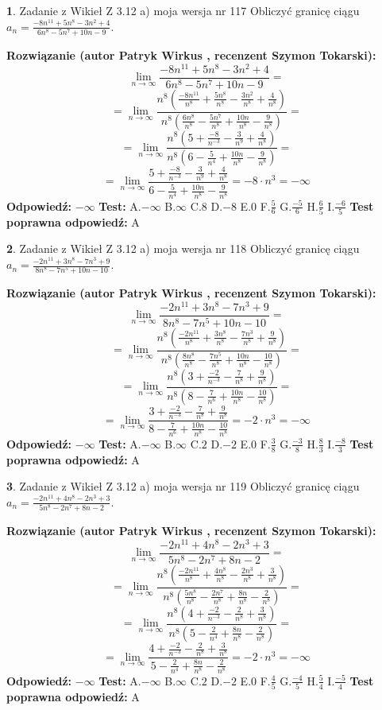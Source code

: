 \documentclass[12pt, a4paper]{article}
\theoremstyle{definition} %
\newtheorem{zad}{}
\newcommand{\zadStart}[1]{\begin{zad}#1\newline}
\newcommand{\zadStop}{\end{zad}}
\newcommand{\rozwStart}[2]{\noindent \textbf{Rozwiązanie (autor #1 , recenzent #2): }\newline}
\newcommand{\rozwStop}{\newline}
\newcommand{\odpStart}{\noindent \textbf{Odpowiedź:}\newline}
\newcommand{\odpStop}{\newline}
\newcommand{\testStart}{\noindent \textbf{Test:}\newline}
\newcommand{\testStop}{\newline}
\newcommand{\kluczStart}{\noindent \textbf{Test poprawna odpowiedź:}\newline}
\newcommand{\kluczStop}{\newline}
\begin{document}
\zadStart{Zadanie z Wikieł Z 3.12 a) moja wersja nr 117}
Obliczyć granicę ciągu $a_{n}=\frac{-8n^{11}+5n^{8}-3n^{2}+4}{6n^{8}-5n^{7}+10n-9}$.
\zadStop
\rozwStart{Patryk Wirkus}{Szymon Tokarski}
$$\lim\limits_{n\to\infty}\frac{-8n^{11}+5n^{8}-3n^{2}+4}{6n^{8}-5n^{7}+10n-9}=$$
$$=\lim\limits_{n\to\infty}\frac{n^{8}\left(\frac{-8n^{11}}{n^{8}}+\frac{5n^{8}}{n^{8}}-\frac{3n^{2}}{n^{8}}+\frac{4}{n^{8}}\right)}{n^{8}\left(\frac{6n^{8}}{n^{8}}-\frac{5n^{7}}{n^{8}}+\frac{10n}{n^{8}}-\frac{9}{n^{8}}\right)}=$$
$$=\lim\limits_{n\to\infty}\frac{n^{8}\left(5+\frac{-8}{n^{-3}}-\frac{3}{n^{9}}+\frac{4}{n^{8}}\right)}
{n^{8}\left(6-\frac{5}{n^{4}}+\frac{10n}{n^{8}}-\frac{9}{n^{8}}\right)}=$$
$$=\lim\limits_{n\to\infty}\frac{5+\frac{-8}{n^{-3}}-\frac{3}{n^{9}}+\frac{4}{n^{8}}}{6-\frac{5}{n^{4}}+\frac{10n}{n^{8}}-\frac{9}{n^{8}}}=-8\cdot n^{3} = -\infty$$
\rozwStop
\odpStart
$-\infty$
\odpStop
\testStart
A.$-\infty$
B.$\infty$
C.$8$
D.$-8$
E.$0$
F.$\frac{5}{6}$
G.$\frac{-5}{6}$
H.$\frac{6}{5}$
I.$\frac{-6}{5}$
\testStop
\kluczStart
A
\kluczStop



\zadStart{Zadanie z Wikieł Z 3.12 a) moja wersja nr 118}
Obliczyć granicę ciągu $a_{n}=\frac{-2n^{11}+3n^{8}-7n^{3}+9}{8n^{8}-7n^{5}+10n-10}$.
\zadStop
\rozwStart{Patryk Wirkus}{Szymon Tokarski}
$$\lim\limits_{n\to\infty}\frac{-2n^{11}+3n^{8}-7n^{3}+9}{8n^{8}-7n^{5}+10n-10}=$$
$$=\lim\limits_{n\to\infty}\frac{n^{8}\left(\frac{-2n^{11}}{n^{8}}+\frac{3n^{8}}{n^{8}}-\frac{7n^{3}}{n^{8}}+\frac{9}{n^{8}}\right)}{n^{8}\left(\frac{8n^{8}}{n^{8}}-\frac{7n^{5}}{n^{8}}+\frac{10n}{n^{8}}-\frac{10}{n^{8}}\right)}=$$
$$=\lim\limits_{n\to\infty}\frac{n^{8}\left(3+\frac{-2}{n^{-3}}-\frac{7}{n^{8}}+\frac{9}{n^{8}}\right)}
{n^{8}\left(8-\frac{7}{n^{6}}+\frac{10n}{n^{8}}-\frac{10}{n^{8}}\right)}=$$
$$=\lim\limits_{n\to\infty}\frac{3+\frac{-2}{n^{-3}}-\frac{7}{n^{8}}+\frac{9}{n^{8}}}{8-\frac{7}{n^{6}}+\frac{10n}{n^{8}}-\frac{10}{n^{8}}}=-2\cdot n^{3} = -\infty$$
\rozwStop
\odpStart
$-\infty$
\odpStop
\testStart
A.$-\infty$
B.$\infty$
C.$2$
D.$-2$
E.$0$
F.$\frac{3}{8}$
G.$\frac{-3}{8}$
H.$\frac{8}{3}$
I.$\frac{-8}{3}$
\testStop
\kluczStart
A
\kluczStop



\zadStart{Zadanie z Wikieł Z 3.12 a) moja wersja nr 119}
Obliczyć granicę ciągu $a_{n}=\frac{-2n^{11}+4n^{8}-2n^{3}+3}{5n^{8}-2n^{7}+8n-2}$.
\zadStop
\rozwStart{Patryk Wirkus}{Szymon Tokarski}
$$\lim\limits_{n\to\infty}\frac{-2n^{11}+4n^{8}-2n^{3}+3}{5n^{8}-2n^{7}+8n-2}=$$
$$=\lim\limits_{n\to\infty}\frac{n^{8}\left(\frac{-2n^{11}}{n^{8}}+\frac{4n^{8}}{n^{8}}-\frac{2n^{3}}{n^{8}}+\frac{3}{n^{8}}\right)}{n^{8}\left(\frac{5n^{8}}{n^{8}}-\frac{2n^{7}}{n^{8}}+\frac{8n}{n^{8}}-\frac{2}{n^{8}}\right)}=$$
$$=\lim\limits_{n\to\infty}\frac{n^{8}\left(4+\frac{-2}{n^{-3}}-\frac{2}{n^{8}}+\frac{3}{n^{8}}\right)}
{n^{8}\left(5-\frac{2}{n^{4}}+\frac{8n}{n^{8}}-\frac{2}{n^{8}}\right)}=$$
$$=\lim\limits_{n\to\infty}\frac{4+\frac{-2}{n^{-3}}-\frac{2}{n^{8}}+\frac{3}{n^{8}}}{5-\frac{2}{n^{4}}+\frac{8n}{n^{8}}-\frac{2}{n^{8}}}=-2\cdot n^{3} = -\infty$$
\rozwStop
\odpStart
$-\infty$
\odpStop
\testStart
A.$-\infty$
B.$\infty$
C.$2$
D.$-2$
E.$0$
F.$\frac{4}{5}$
G.$\frac{-4}{5}$
H.$\frac{5}{4}$
I.$\frac{-5}{4}$
\testStop
\kluczStart
A
\kluczStop
\end{document}
